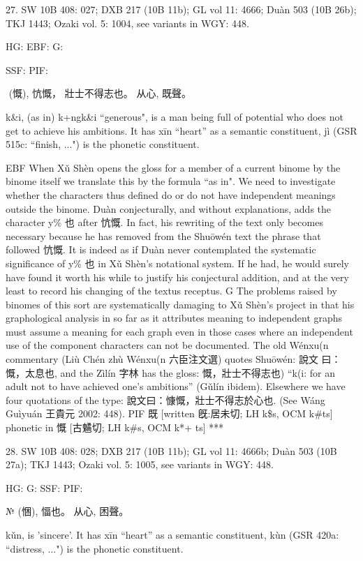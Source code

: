 27. SW 10B 408: 027; DXB 217 (10B 11b); GL vol 11: 4666; Duàn 503 (10B 26b); TKJ 1443; Ozaki vol. 5: 1004, see
variants in WGY: 448.


HG:
EBF: G:

SSF: PIF:

 (慨),
忼慨，
壯士不得志也。
从心, 既聲。

k&i,
(as in) k+ngk&i ``generous",
is a man being full of potential who does not get to achieve his ambitions.
It has xīn ``heart'' as a semantic constituent,
jì (GSR 515c: ``finish, ...") is the phonetic constituent.

EBF When Xǔ Shèn opens the gloss for a member of a current binome by the binome itself we translate this by the formula ``as in". We need to investigate whether the characters thus defined do or do not have independent meanings outside the binome.
Duàn conjecturally, and without explanations, adds the character y\% 也 after 忼慨. In fact, his
rewriting of the text only becomes necessary because he has removed from the Shuōwén text the phrase that followed 忼慨. It is indeed as if Duàn never contemplated the systematic significance of y\% 也 in Xǔ Shèn's notational system. If he had, he would surely have found it worth his while to justify his conjectural addition, and at the very least to record his changing of the textus receptus.
G    The problems raised by binomes of this sort are systematically damaging to Xǔ Shèn's project in that his graphological analysis in so far as it attributes meaning to independent graphs must assume a meaning for each graph even in those cases where an independent use of the component characters can not be documented.
The old Wénxu(n commentary (Liù Chén zhù Wénxu(n 六臣注文選) quotes Shuōwén: 說文
曰：慨，太息也, and the Zìlín 字林 has the gloss: 慨，壯士不得志也) ``k(i: for an adult not to have achieved one's ambitions'' (Gǔlín ibidem). Elsewhere we have four quotations of the type: 說文曰：慷慨，壯士不得志於心也. (See Wáng Guìyuán 王貴元 2002: 448).
PIF   既 [written 旣:居未切; LH k\$s, OCM k\#ts] phonetic in 慨 [古䰬切; LH k\#s, OCM k*+ ts]
***

28. SW 10B 408: 028; DXB 217 (10B 11b); GL vol 11: 4666b; Duàn 503 (10B 27a); TKJ 1443; Ozaki vol. 5: 1005, see
variants in WGY: 448.


HG:
G: SSF: PIF:

№ (悃), 愊也。 从心,
困聲。


kǔn,
is 'sincere'.
It has xīn ``heart'' as a semantic constituent,
kùn (GSR 420a: ``distress, ...") is the phonetic constituent.




